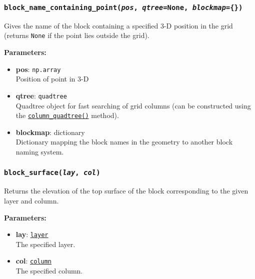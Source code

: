 \begin{snugshade}\subsubsection{\texttt{block\_name\_containing\_point(\emph{pos}, \emph{qtree}=None, \emph{blockmap}=\{\})}}\end{snugshade}
\label{sec:mulgrid:block_name_containing_point}

Gives the name of the block containing a specified 3-D position in the grid (returns \texttt{None} if the point lies outside the grid).

\textbf{Parameters:}
\begin{itemize}
\item \textbf{pos}: \texttt{np.array}\\
  Position of point in 3-D
\item \textbf{qtree}: \texttt{quadtree}\\
  Quadtree object for fast searching of grid columns (can be constructed using the \hyperref[sec:mulgrid:column_quadtree]{\texttt{column\_quadtree()}} method).
\item \textbf{blockmap}: dictionary\\
  Dictionary mapping the block names in the geometry to another block naming system.
\end{itemize}

\begin{snugshade}\subsubsection{\texttt{block\_surface(\emph{lay}, \emph{col})}}\end{snugshade}
\label{sec:mulgrid:block_surface}

Returns the elevation of the top surface of the block corresponding to the given layer and column.

\textbf{Parameters:}
\begin{itemize}
\item \textbf{lay}: \hyperref[layerobjects]{\texttt{layer}}\\
  The specified layer.
\item \textbf{col}: \hyperref[columnobjects]{\texttt{column}}\\
  The specified column.
\end{itemize}

